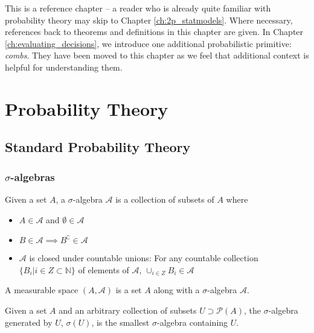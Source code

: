 This is a reference chapter -- a reader who is already quite familiar with probability theory may skip to Chapter \ref{ch:2p_statmodels}. Where necessary, references back to theorems and definitions in this chapter are given. In Chapter \ref{ch:evaluating_decisions}, we introduce one additional probabilistic primitive: \emph{combs}. They have been moved to this chapter as we feel that additional context is helpful for understanding them.

\section{Probability Theory}

\subsection{Standard Probability Theory}\label{sec:standard_prob}

\subsubsection{$\sigma$-algebras}

\begin{definition}
Given a set $A$, a $\sigma$-algebra $\mathcal{A}$ is a collection of subsets of $A$ where
\begin{itemize}
	\item $A\in \mathcal{A}$ and $\emptyset\in \mathcal{A}$
	\item $B\in \mathcal{A}\implies B^{\complement}\in\mathcal{A}$
	\item $\mathcal{A}$ is closed under countable unions: For any countable collection $\{B_i|i\in Z\subset \mathbb{N}\}$ of elements of $\mathcal{A}$, $\cup_{i\in Z}B_i\in \mathcal{A}$ 
\end{itemize}
\end{definition}

\begin{definition}
A measurable space $(A,\mathcal{A})$ is a set $A$ along with a $\sigma$-algebra $\mathcal{A}$.
\end{definition}

\begin{definition}
Given a set $A$ and an arbitrary collection of subsets $U\supset\mathscr{P}(A)$, the $\sigma$-algebra generated by $U$, $\sigma(U)$, is the smallest $\sigma$-algebra containing $U$.
\end{definition}


